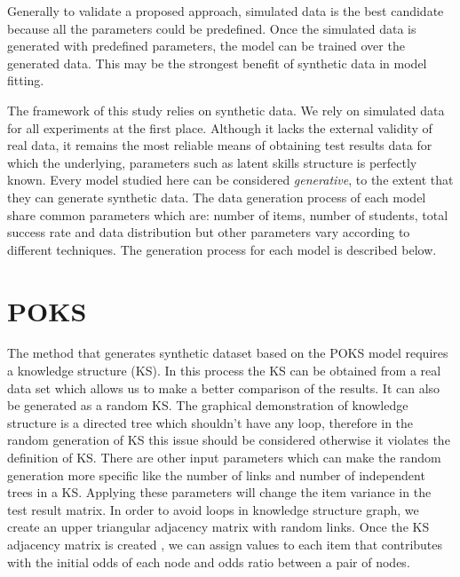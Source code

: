 \label{sec:Syn}



Generally to validate a proposed approach, simulated data is the best candidate because all the parameters could be predefined. Once the simulated data is generated with predefined parameters, the model can be trained over the generated data. This may be the strongest benefit of synthetic data in model fitting. 

The framework of this study relies on synthetic data. We rely on simulated data for all experiments at the first place. Although it lacks the external validity of real data, it remains the most reliable means of obtaining test results data for which the underlying, parameters such as latent skills structure is perfectly known. Every model studied here can be considered \textit{generative}, to the extent that they can generate synthetic data.  The data generation process of each model share common parameters which are: number of items, number of students, total success rate and data distribution but other parameters vary according to different techniques.  The generation process for each model is described below.


\section{POKS}
The method that generates synthetic dataset based on the POKS model requires a knowledge structure (KS). In this process the KS can be obtained from a real data set which allows us to make a better comparison of the results. It can also be generated as a random KS. The graphical demonstration of knowledge structure is a directed tree which shouldn't have any loop, therefore in the random generation of KS this issue should be considered otherwise it violates the definition of KS. There are other input parameters which can make the random generation more specific like the number of links and number of independent trees in a KS. Applying these parameters will change the item variance in the test result matrix. In order to avoid loops in knowledge structure graph, we create an upper triangular adjacency matrix with random links. Once the KS adjacency matrix is created , we can assign values to each item that contributes with the initial odds of each node and odds ratio between a pair of nodes.


